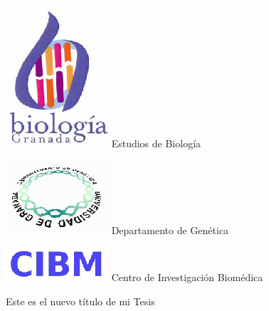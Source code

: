 \documentclass[b5paper,twoside,10pt]{book}
\newcommand{\titulo}{Este es el nuevo título de mi Tesis}
\begin{document}
\begin{minipage}[b]{.23\textwidth}
\centering
\includegraphics[width=.7\textwidth]{biologia}
Estudios de Biolog\'ia
\end{minipage}
\hfill
\begin{minipage}[b]{.23\textwidth}
\centering
\includegraphics[width=.7\textwidth]{genetica}
Departamento de Gen\'etica
\end{minipage}
\hfill
\begin{minipage}[b]{.23\textwidth}
\centering
\includegraphics[width=.7\textwidth]{cibm}
Centro de Investigaci\'on Biom\'edica
\end{minipage}
\vfill
\begin{center}
\LARGE
\titulo

\end{center}
\vfill
\end{document}
